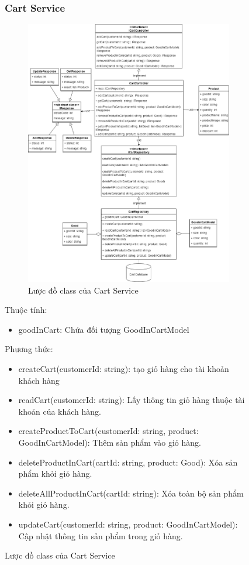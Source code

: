 \begin{figure}[!htp]
\subsubsection{Cart Service}
\begin{figure}[!htp]
	\centering
	\includegraphics[width=11cm]{img/Architecture/service/CartService.png}
	\newline
	\caption{Lược đồ class của Cart Service}
\end{figure}

	Thuộc tính:
	\begin{itemize}
		\item goodInCart: Chứa đối tượng GoodInCartModel
	\end{itemize}
	Phương thức:
	\begin{itemize}
		\item createCart(customerId: string): tạo giỏ hàng cho tài khoản khách hàng
		\item readCart(customerId: string): Lấy thông tin giỏ hàng thuộc tài khoản của khách hàng.
		\item createProductToCart(customerId: string, product: GoodInCartModel): Thêm sản phẩm vào giỏ hàng.
		\item deleteProductInCart(cartId: string, product: Good): Xóa sản phẩm khỏi giỏ hàng.
		\item deleteAllProductInCart(cartId: string): Xóa toàn bộ sản phẩm khỏi giỏ hàng.
		\item updateCart(customerId: string, product: GoodInCartModel): Cập nhật thông tin sản phẩm trong giỏ hàng.
	\end{itemize}


\end{figure}
